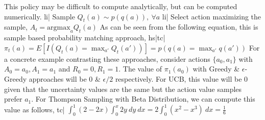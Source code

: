 This policy may be difficult to compute analytically, but can be computed numerically.
li| Sample \( Q_t(a) \sim p(q(a)), \ \forall a \)
li| Select action maximizing the sample, \( A_t = \text{argmax}_a Q_t(a) \)
As can be seen from the following equation, this is sample based probability matching approach,
hs|tc| \( \pi_t(a) = E[I(Q_t(a) = \max_{a'} Q_t(a'))] = p(q(a) = \max_{a'} q(a')) \)
For a concrete example contrasting these approaches, consider actions \( \{ a_0, a_1 \} \) with \( A_0 = a_0, A_1 = a_1 \) and \( R_0 = 0, R_1 = 1 \). The value of \( \pi_{1}(a_0) \) with Greedy & \(\epsilon\)-Greedy approaches will be \( 0 \) & \( \epsilon/2 \) respectively. For UCB, this value will be \( 0 \) given that the uncertainty values are the same but the action value samples prefer \( a_1 \). For Thompson Sampling with Beta Distribution, we can compute this value as follows,
tc| \( \int_0^1 (2 - 2x) \int_0^x 2y \ dy \ dx = 2 \int_0^1 (x^2 - x^3) \ dx = \frac{1}{6} \)
